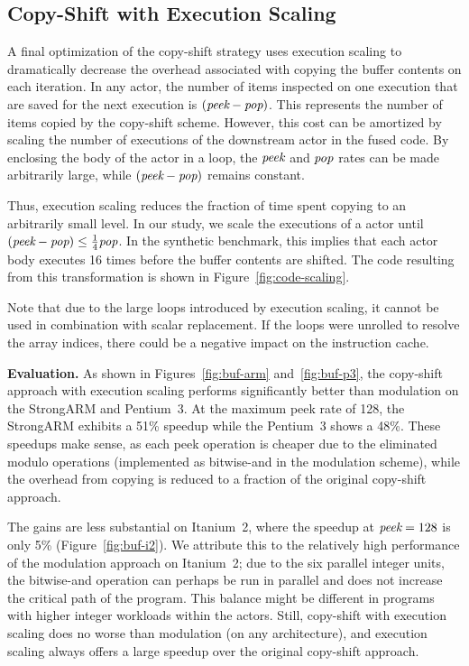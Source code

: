 \subsection{Copy-Shift with Execution Scaling}

A final optimization of the copy-shift strategy uses execution scaling
to dramatically decrease the overhead associated with copying the
buffer contents on each iteration.  In any actor, the number of items
inspected on one execution that are saved for the next
execution is $(\mbox{\it peek} - \mbox{\it pop})$.  This represents
the number of items copied by the copy-shift scheme.  However, this
cost can be amortized by scaling the number of executions of the
downstream actor in the fused code.  By enclosing the body of the
actor in a loop, the $\mbox{\it peek}$ and $\mbox{\it pop}$ rates can
be made arbitrarily large, while $(\mbox{\it peek} - \mbox{\it pop})$
remains constant.

Thus, execution scaling reduces the fraction of time spent copying to
an arbitrarily small level.  In our study, we scale the executions of
a actor until $(\mbox{\it peek} - \mbox{\it pop}) \leq \frac{1}{4}
\mbox{\it pop}$.  In the synthetic benchmark, this implies that each
actor body executes 16 times before the buffer contents are shifted.
The code resulting from this transformation is shown in
Figure~\ref{fig:code-scaling}.

Note that due to the large loops introduced by execution scaling, it
cannot be used in combination with scalar replacement.  If the loops
were unrolled to resolve the array indices, there could be a negative
impact on the instruction cache.

{\bf Evaluation.}  As shown in Figures~\ref{fig:buf-arm}
and~\ref{fig:buf-p3}, the copy-shift approach with execution scaling
performs significantly better than modulation on the StrongARM and
Pentium~3.  At the maximum peek rate of 128, the StrongARM exhibits a
51\% speedup while the Pentium~3 shows a 48\%.  These speedups make
sense, as each peek operation is cheaper due to the eliminated modulo
operations (implemented as bitwise-and in the modulation scheme),
while the overhead from copying is reduced to a fraction of the
original copy-shift approach.

The gains are less substantial on Itanium~2, where the speedup at
$\mbox{\it peek} = 128$ is only 5\% (Figure~\ref{fig:buf-i2}).  We
attribute this to the relatively high performance of the modulation
approach on Itanium~2; due to the six parallel integer units, the
bitwise-and operation can perhaps be run in parallel and does not
increase the critical path of the program.  This balance might be
different in programs with higher integer workloads within the actors.
Still, copy-shift with execution scaling does no worse than modulation
(on any architecture), and execution scaling always offers a large
speedup over the original copy-shift approach.

